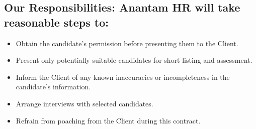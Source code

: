 \documentclass{article}
\newenvironment{customlist}
  {\begin{itemize}[leftmargin=*, label=$\bullet$, itemsep=0.5em]}
  {\end{itemize}}
\begin{document}
\begin{enumerate}[label=\arabic{enumi}.]
        \subsection*{\color{secondary} Our Responsibilities: Anantam HR will take reasonable steps to:}
        \begin{customlist}
            \item Obtain the candidate's permission before presenting them to the Client.
            \item Present only potentially suitable candidates for short-listing and assessment.
            \item Inform the Client of any known inaccuracies or incompleteness in the candidate's information.
            \item Arrange interviews with selected candidates.
            \item Refrain from poaching from the Client during this contract.
        \end{customlist}

\end{enumerate}
\end{document}

